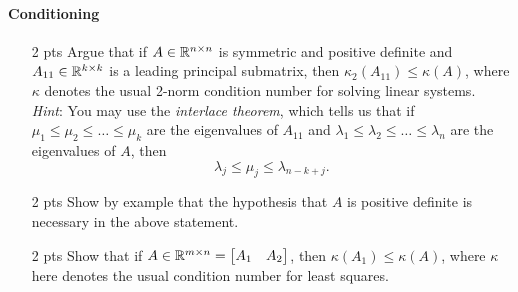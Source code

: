 \documentclass[12pt, leqno]{article} %
\begin{document}
\paragraph*{Conditioning}
\begin{itemize}
\item[2 pts]
  Argue that if $A \in \mathbb{R}^{n \times n}$ is symmetric and positive definite and
  $A_{11} \in \mathbb{R}^{k \times k}$ is a leading principal submatrix,
  then $\kappa_2(A_{11}) \leq \kappa(A)$, where $\kappa$ denotes
  the usual 2-norm condition number for solving linear systems. \\[2mm]
  {\em Hint}: You may use the {\em interlace theorem}, which tells
  us that if $\mu_1 \leq \mu_2 \leq \ldots \leq \mu_k$ are the
  eigenvalues of $A_{11}$ and 
  $\lambda_1 \leq \lambda_2 \leq \ldots \leq \lambda_n$ are the
  eigenvalues of $A$, then
  \[
    \lambda_j \leq \mu_j \leq \lambda_{n-k+j}.
  \]
\item[2 pts]
  Show by example that the hypothesis that $A$ is positive definite
  is necessary in the above statement.
\item[2 pts]
  Show that if
  $A \in \mathbb{R}^{m \times n} = \begin{bmatrix} A_1 & A_2 \end{bmatrix}$,
  then $\kappa(A_1) \leq \kappa(A)$, where $\kappa$ here denotes the
  usual condition number for least squares.
\end{itemize}
\end{document}
